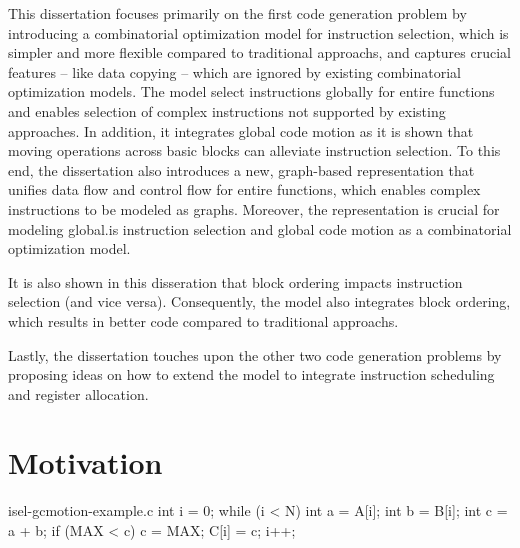 This dissertation focuses primarily on the first \gls{code generation} problem
by introducing a combinatorial optimization model for \gls{instruction
  selection}, which is simpler and more flexible compared to \glspl{traditional
  approach}, and captures crucial features -- like \gls{data copying} -- which
are ignored by existing combinatorial optimization models.
%
The model select \glspl{instruction} globally for entire
\glspl{function} and enables selection of complex \glspl{instruction} not
supported by existing approaches.
%
In addition, it integrates \gls{global code motion} as it is shown that moving
\glspl{operation} across \glspl{basic block} can alleviate \gls{instruction
  selection}.
%
To this end, the dissertation also introduces a new, \gls{graph}-based
representation that unifies data flow and control flow for entire
\glspl{function}, which enables complex \glspl{instruction} to be modeled as
\glspl{graph}.
%
Moreover, the representation is crucial for modeling \gls{global.is}
\gls{instruction selection} and \gls{global code motion} as a combinatorial
optimization model.

It is also shown in this disseration that \gls{block ordering} impacts
\gls{instruction selection} (and vice versa).
%
Consequently, the model also integrates \gls{block ordering}, which results in
better code compared to \glspl{traditional approach}.

Lastly, the dissertation touches upon the other two \gls{code generation}
problems by proposing ideas on how to extend the model to integrate
\gls{instruction scheduling} and \gls{register allocation}.



\section{Motivation}

\begin{filecontents*}{isel-gcmotion-example.c}
int i = 0;
while (i < N) {
  int a = A[i];
  int b = B[i];
  int c = a + b;
  if (MAX < c) c = MAX;
  C[i] = c;
  i++;
}
\end{filecontents*}

